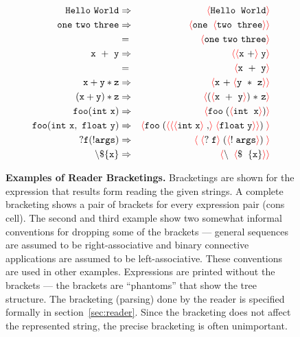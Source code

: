 \documentclass{article}
\newcommand{\fopen}{{\color{red} \langle}}
\newcommand{\fclose}{{\color{red} \rangle}}
\begin{document}
\begin{figure}
\begin{eqnarray*}
  \mathtt{Hello~World} & \Rightarrow & \fopen \mathtt{Hello}\;\; \mathtt{World}\fclose \\
  \mathtt{one~two~three} & \Rightarrow & \fopen \mathtt{one}\;\; \fopen \mathtt{two} \; \;\mathtt{three}\fclose\fclose \\
   & = & \fopen \mathtt{one~two~three} \fclose \\
  \mathtt{x~+~y} & \Rightarrow & \fopen\fopen \mathtt{x~+}\fclose\;\mathtt{y}\fclose \\
  & = & \fopen \mathtt{x~+~y} \fclose \\
  \mathtt{x+y*z} & \Rightarrow & \fopen \mathtt{x~+}\; \fopen \mathtt{y~*~z} \fclose\fclose \\
  \mathtt{(x+y)*z} & \Rightarrow & \fopen (\fopen \mathtt{x~+~y} \fclose )\;\mathtt{*~z}\fclose \\
  \mathtt{foo}(\mathtt{int~x}) & \Rightarrow & \fopen \mathtt{foo}\; (\fopen \mathtt{int}\;  \; \mathtt{x}\fclose)\fclose \\
  \mathtt{foo(int~x,~float~y)} & \Rightarrow & \fopen \mathtt{foo} \; (\fopen\fopen\fopen \mathtt{int}\; \mathtt{x}\fclose\;
  \mathtt{,}\fclose\; \fopen\mathtt{float} \; \mathtt{y} \fclose\fclose )\;\fclose \\ 
  ?\mathtt{f}(\mathtt{!args}) & \Rightarrow & \fopen\;\fopen?\;\mathtt{f}\fclose\; (\fopen \mathtt{!} \;\mathtt{args}\fclose)\;\fclose \\
  \backslash \$\{\mathtt{x}\} & \Rightarrow & \fopen \backslash\;\; \fopen\$ \;\;\{\mathtt{x}\}\fclose\fclose
\end{eqnarray*}

\caption{{\bf Examples of Reader Bracketings.} Bracketings are shown for the expression that results form reading the given strings.
  A complete bracketing shows a pair of brackets for every expression pair (cons cell).
  The second and third example show two somewhat informal conventions for dropping some of the brackets --- general sequences are
  assumed to be right-associative and binary connective applications are assumed to be left-associative.  These conventions are used in other examples.
  Expressions are printed without the brackets --- the brackets are ``phantoms'' that show the tree structure.   The bracketing (parsing) done by the reader
  is specified formally in section~\ref{sec:reader}. Since the bracketing does not affect the represented string, the precise bracketing is often unimportant.}
\label{fig:reader}
\end{figure}
\end{document}
